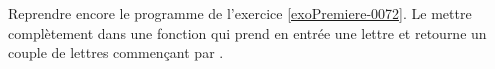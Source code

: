 
\begin{exercice}\label{exoPremiere-0073}

    Reprendre encore le programme de l'exercice \ref{exoPremiere-0072}. Le mettre complètement dans une fonction qui prend en entrée une lettre  et retourne un couple de lettres commençant par .

\end{exercice}
